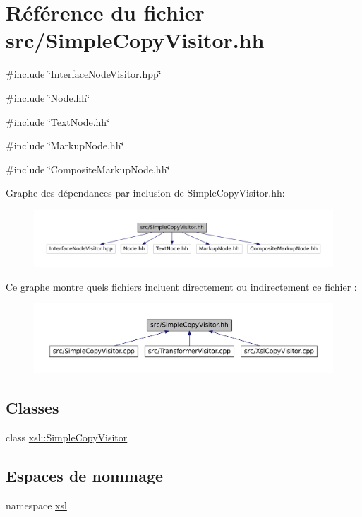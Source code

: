 \hypertarget{_simple_copy_visitor_8hh}{
\section{Référence du fichier src/SimpleCopyVisitor.hh}
\label{_simple_copy_visitor_8hh}
}
{\ttfamily \#include \char`\"{}InterfaceNodeVisitor.hpp\char`\"{}}\par
{\ttfamily \#include \char`\"{}Node.hh\char`\"{}}\par
{\ttfamily \#include \char`\"{}TextNode.hh\char`\"{}}\par
{\ttfamily \#include \char`\"{}MarkupNode.hh\char`\"{}}\par
{\ttfamily \#include \char`\"{}CompositeMarkupNode.hh\char`\"{}}\par
Graphe des dépendances par inclusion de SimpleCopyVisitor.hh:
\nopagebreak
\begin{figure}[H]
\begin{center}
\leavevmode
\includegraphics[width=400pt]{_simple_copy_visitor_8hh__incl}
\end{center}
\end{figure}
Ce graphe montre quels fichiers incluent directement ou indirectement ce fichier :
\nopagebreak
\begin{figure}[H]
\begin{center}
\leavevmode
\includegraphics[width=400pt]{_simple_copy_visitor_8hh__dep__incl}
\end{center}
\end{figure}
\subsection*{Classes}
\begin{DoxyCompactItemize}
\item 
class \hyperlink{classxsl_1_1_simple_copy_visitor}{xsl::SimpleCopyVisitor}
\end{DoxyCompactItemize}
\subsection*{Espaces de nommage}
\begin{DoxyCompactItemize}
\item 
namespace \hyperlink{namespacexsl}{xsl}
\end{DoxyCompactItemize}
